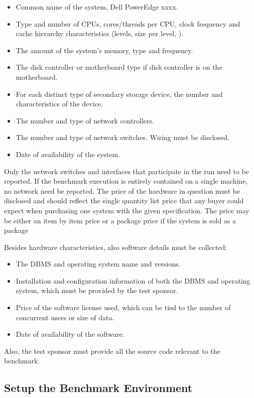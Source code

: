 \begin{itemize}
\item Common name of the system, \eg Dell PowerEdge xxxx.
\item Type and number of CPUs, cores/threads per CPU, clock frequency and cache hierarchy characteristics (levels, size per level, \etc).
\item The amount of the system's memory, type and frequency.
\item The disk controller or motherboard type if disk controller is on the motherboard.
\item For each distinct type of secondary storage device, the number and characteristics of the device.
\item The number and type of network controllers.
\item The number and type of network switches. Wiring must be disclosed.
\item Date of availability of the system.
\end{itemize}

Only the network switches and interfaces that participate in the run need to be
reported. If the benchmark execution is entirely contained on a single machine,
no network need be reported.  The price of the hardware in question must be
disclosed and should reflect the single quantity list price that any buyer
could expect when purchasing one system with the given specification. The price
may be either an item by item price or a package price if the system is sold as
a package

Besides hardware characteristics, also software details must be collected:

\begin{itemize}
\item The DBMS and operating system name and versions.
\item Installation and configuration information of both the DBMS and operating
system, which must be provided by the test sponsor.
\item Price of the software license used, which can be tied to the number of
concurrent users or size of data.
\item Date of availability of the software.
\end{itemize}

Also, the test sponsor must provide all the source code relevant to the
benchmark.

\subsection{Setup the Benchmark Environment}


